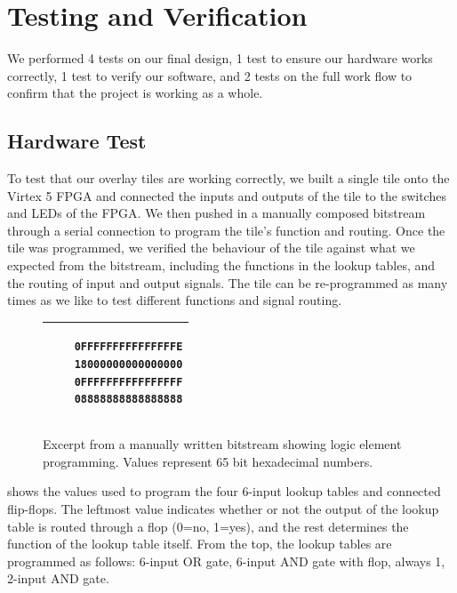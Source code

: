 \section{Testing and Verification}

We performed 4 tests on our final design, 1 test to ensure our hardware works correctly, 1 test to verify our software, and 2 tests on the full work flow to confirm that the project is working as a whole.

\subsection{Hardware Test}

To test that our overlay tiles are working correctly, we built a single tile onto the Virtex 5 FPGA and connected the inputs and outputs of the tile to the switches and LEDs of the FPGA.
We then pushed in a manually composed bitstream through a serial connection to program the tile's function and routing.
Once the tile was programmed, we verified the behaviour of the tile against what we expected from the bitstream, including the functions in the lookup tables, and the routing of input and output signals.
The tile can be re-programmed as many times as we like to test different functions and signal routing.

\begin{figure}[!h]
	\centering
	\begin{tabular}{|p{13cm}|}
	\hline
	\begin{verbatim}
	0FFFFFFFFFFFFFFFE
	18000000000000000
	0FFFFFFFFFFFFFFFF
	08888888888888888
	\end{verbatim}
	\\ \hline
	\end{tabular}
	\caption{Excerpt from a manually written bitstream showing logic element programming. Values represent 65 bit hexadecimal numbers.}
	\label{manual-bitstream}
\end{figure}

 shows the values used to program the four 6-input lookup tables and connected flip-flops.
The leftmost value indicates whether or not the output of the lookup table is routed through a flop (0=no, 1=yes), and the rest determines the function of the lookup table itself.
From the top, the lookup tables are programmed as follows: 6-input OR gate, 6-input AND gate with flop, always 1, 2-input AND gate.

